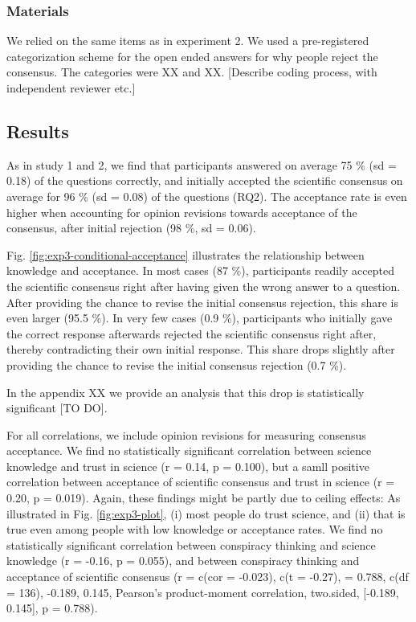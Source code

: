 \documentclass[
  doc,floatsintext]{apa6}
\begin{document}
\subsubsection{Materials}\label{materials-2}

We relied on the same items as in experiment 2. We used a pre-registered categorization scheme for the open ended answers for why people reject the consensus. The categories were XX and XX. {[}Describe coding process, with independent reviewer etc.{]}

\subsection{Results}\label{results-2}

As in study 1 and 2, we find that participants answered on average 75 \% (sd = 0.18) of the questions correctly, and initially accepted the scientific consensus on average for 96 \% (sd = 0.08) of the questions (RQ2). The acceptance rate is even higher when accounting for opinion revisions towards acceptance of the consensus, after initial rejection (98 \%, sd = 0.06).

Fig. \ref{fig:exp3-conditional-acceptance} illustrates the relationship between knowledge and acceptance. In most cases (87 \%), participants readily accepted the scientific consensus right after having given the wrong answer to a question. After providing the chance to revise the initial consensus rejection, this share is even larger (95.5 \%). In very few cases (0.9 \%), participants who initially gave the correct response afterwards rejected the scientific consensus right after, thereby contradicting their own initial response. This share drops slightly after providing the chance to revise the initial consensus rejection (0.7 \%).

In the appendix XX we provide an analysis that this drop is statistically significant {[}TO DO{]}.

For all correlations, we include opinion revisions for measuring consensus acceptance. We find no statistically significant correlation between science knowledge and trust in science (r = 0.14, p = 0.100), but a samll positive correlation between acceptance of scientific consensus and trust in science (r = 0.20, p = 0.019). Again, these findings might be partly due to ceiling effects: As illustrated in Fig. \ref{fig:exp3-plot}, (i) most people do trust science, and (ii) that is true even among people with low knowledge or acceptance rates. We find no statistically significant correlation between conspiracy thinking and science knowledge (r = -0.16, p = 0.055), and between conspiracy thinking and acceptance of scientific consensus (r = c(cor = -0.023), c(t = -0.27), = 0.788, c(df = 136), -0.189, 0.145, Pearson's product-moment correlation, two.sided, {[}-0.189, 0.145{]}, p = 0.788).
\end{document}
